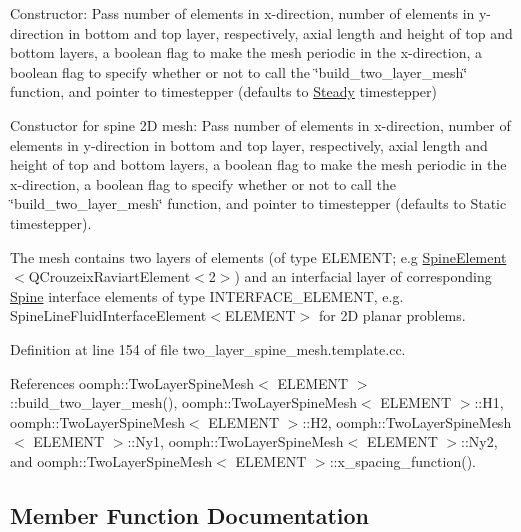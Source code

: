 Constructor\+: Pass number of elements in x-\/direction, number of elements in y-\/direction in bottom and top layer, respectively, axial length and height of top and bottom layers, a boolean flag to make the mesh periodic in the x-\/direction, a boolean flag to specify whether or not to call the \char`\"{}build\+\_\+two\+\_\+layer\+\_\+mesh\char`\"{} function, and pointer to timestepper (defaults to \hyperlink{classoomph_1_1Steady}{Steady} timestepper) 

Constuctor for spine 2D mesh\+: Pass number of elements in x-\/direction, number of elements in y-\/direction in bottom and top layer, respectively, axial length and height of top and bottom layers, a boolean flag to make the mesh periodic in the x-\/direction, a boolean flag to specify whether or not to call the \char`\"{}build\+\_\+two\+\_\+layer\+\_\+mesh\char`\"{} function, and pointer to timestepper (defaults to Static timestepper).

The mesh contains two layers of elements (of type E\+L\+E\+M\+E\+NT; e.\+g \hyperlink{classoomph_1_1SpineElement}{Spine\+Element}$<$Q\+Crouzeix\+Raviart\+Element$<$2$>$) and an interfacial layer of corresponding \hyperlink{classoomph_1_1Spine}{Spine} interface elements of type I\+N\+T\+E\+R\+F\+A\+C\+E\+\_\+\+E\+L\+E\+M\+E\+NT, e.\+g. Spine\+Line\+Fluid\+Interface\+Element$<$\+E\+L\+E\+M\+E\+N\+T$>$ for 2D planar problems. 

Definition at line 154 of file two\+\_\+layer\+\_\+spine\+\_\+mesh.\+template.\+cc.



References oomph\+::\+Two\+Layer\+Spine\+Mesh$<$ E\+L\+E\+M\+E\+N\+T $>$\+::build\+\_\+two\+\_\+layer\+\_\+mesh(), oomph\+::\+Two\+Layer\+Spine\+Mesh$<$ E\+L\+E\+M\+E\+N\+T $>$\+::\+H1, oomph\+::\+Two\+Layer\+Spine\+Mesh$<$ E\+L\+E\+M\+E\+N\+T $>$\+::\+H2, oomph\+::\+Two\+Layer\+Spine\+Mesh$<$ E\+L\+E\+M\+E\+N\+T $>$\+::\+Ny1, oomph\+::\+Two\+Layer\+Spine\+Mesh$<$ E\+L\+E\+M\+E\+N\+T $>$\+::\+Ny2, and oomph\+::\+Two\+Layer\+Spine\+Mesh$<$ E\+L\+E\+M\+E\+N\+T $>$\+::x\+\_\+spacing\+\_\+function().



\subsection{Member Function Documentation}
\mbox{\label{classoomph_1_1TwoLayerSpineMesh_ada5471a89c3ac91a606b3e5dcc1325cd}} 
